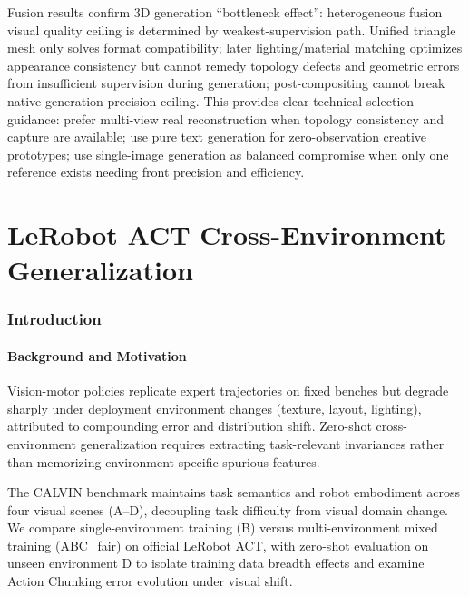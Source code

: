 \documentclass[10pt,twocolumn,letterpaper]{article}
\begin{document}
Fusion results confirm 3D generation ``bottleneck effect'': heterogeneous fusion visual quality ceiling is determined by weakest-supervision path. Unified triangle mesh only solves format compatibility; later lighting/material matching optimizes appearance consistency but cannot remedy topology defects and geometric errors from insufficient supervision during generation; post-compositing cannot break native generation precision ceiling. This provides clear technical selection guidance: prefer multi-view real reconstruction when topology consistency and capture are available; use pure text generation for zero-observation creative prototypes; use single-image generation as balanced compromise when only one reference exists needing front precision and efficiency.

\part{LeRobot ACT Cross-Environment Generalization}

\section{Introduction}
\label{sec:t2-intro}

\subsection{Background and Motivation}

Vision-motor policies replicate expert trajectories on fixed benches but degrade sharply under deployment environment changes (texture, layout, lighting), attributed to compounding error and distribution shift\cite{ross2011dagger,codevilla2019exploring}. Zero-shot cross-environment generalization requires extracting task-relevant invariances rather than memorizing environment-specific spurious features.

The CALVIN benchmark\cite{mees2022calvin} maintains task semantics and robot embodiment across four visual scenes (A--D), decoupling task difficulty from visual domain change. We compare single-environment training (B) versus multi-environment mixed training (ABC\_fair) on official LeRobot ACT\cite{zhao2023learning,cadene2024lerobot}, with zero-shot evaluation on unseen environment D to isolate training data breadth effects and examine Action Chunking error evolution under visual shift.
\end{document}
